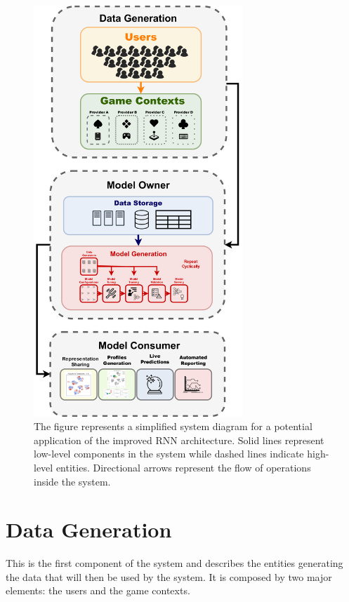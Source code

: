 \begin{figure}[ht]
\centering
\includegraphics[width=0.7\textwidth]{images/chapter_5/pipeline_diagram.png}
\caption[\textbf{Model Deployment Pipeline}]{The figure represents a simplified system diagram for a potential application of the improved RNN architecture. Solid lines represent low-level components in the system while dashed lines indicate high-level entities. Directional arrows represent the flow of operations inside the system.}
\label{pipeline}
\end{figure}

\section{Data Generation}
\label{data_generation}
This is the first component of the system and describes the entities generating the data that will then be used by the system. It is composed by two major elements: the users and the game contexts. 

